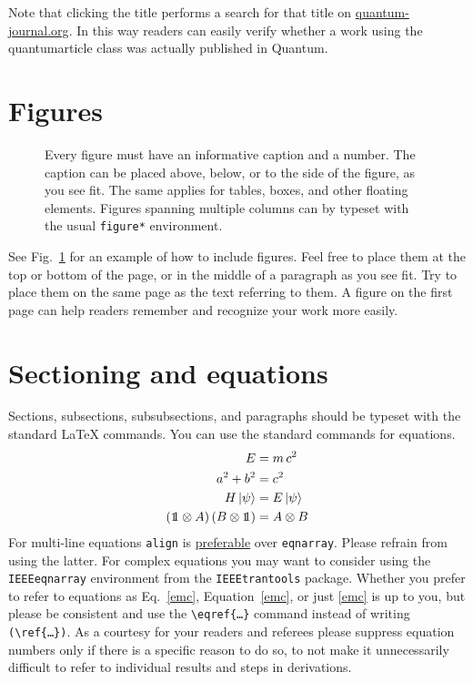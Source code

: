 \documentclass[a4paper,twocolumn,superscriptaddress,11pt,accepted=2017-05-09]{quantumarticle}
\begin{document}
Note that clicking the title performs a search for that title on \href{http://quantum-journal.org}{quantum-journal.org}.
In this way readers can easily verify whether a work using the quantumarticle class was actually published in Quantum.

\section{Figures}
\begin{figure}[t]
  \centering
  \caption{Every figure must have an informative caption and a number.
    The caption can be placed above, below, or to the side of the figure, as you see fit.
    The same applies for tables, boxes, and other floating elements.
    Figures spanning multiple columns can by typeset with the usual \texttt{figure*} environment.}
  \label{fig:figure1}
\end{figure}
See Fig.~\ref{fig:figure1} for an example of how to include figures.
Feel free to place them at the top or bottom of the page, or in the middle of a paragraph as you see fit.
Try to place them on the same page as the text referring to them.
A figure on the first page can help readers remember and recognize your work more easily.

\section{Sectioning and equations}
Sections, subsections, subsubsections, and paragraphs should be typeset with the standard LaTeX commands.
You can use the standard commands for equations.
\begin{align}
  \label{emc}
  E &= m\,c^2\\
  a^2 + b^2 &= c^2\\
  H\,|\psi\rangle &= E\,|\psi\rangle\\
  ({\mbox{\small1}\mkern-5.5mu1} \otimes A)\,(B \otimes {\mbox{\small1}\mkern-5.5mu1}) &= A \otimes B
\end{align}
For multi-line equations \texttt{align} is \href{http://tex.stackexchange.com/questions/196/eqnarray-vs-align}{preferable} over \texttt{eqnarray}.
Please refrain from using the latter.
For complex equations you may want to consider using the \texttt{IEEEeqnarray} environment from the \texttt{IEEEtrantools} package.
Whether you prefer to refer to equations as Eq.~\eqref{emc}, Equation~\ref{emc}, or just \eqref{emc} is up to you, but please be consistent and use the \texttt{\textbackslash{}eqref\{\dots\}} command instead of writing \texttt{(\textbackslash{}ref\{\dots\})}.
As a courtesy for your readers and referees please suppress equation numbers only if there is a specific reason to do so, to not make it unnecessarily difficult to refer to individual results and steps in derivations.
\end{document}
